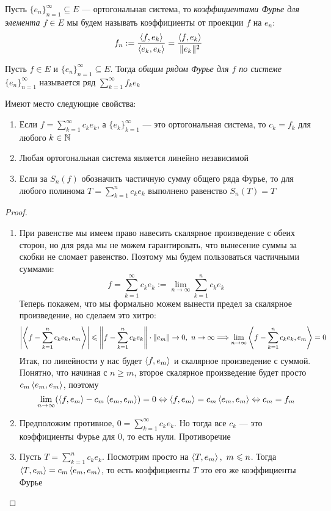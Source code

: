 \begin{definition}
	Пусть $\{e_n\}_{n = 1}^\infty \subseteq E$ --- ортогональная система, то \textit{коэффициентами Фурье для элемента $f \in E$} мы будем называть коэффициенты от проекции $f$ на $e_n$:
	\[
		f_n := \frac{\left\langle f, e_k\right\rangle}{\left\langle e_k, e_k\right\rangle} = \frac{\left\langle f, e_k\right\rangle}{\|e_k\|^2}
	\]
\end{definition}

\begin{definition}
	Пусть $f \in E$ и $\{e_n\}_{n = 1}^\infty \subseteq E$. Тогда \textit{общим рядом Фурье для $f$ по системе $\{e_n\}_{n = 1}^\infty$} называется ряд $\sum_{k = 1}^\infty f_ke_k$
\end{definition}

\begin{proposition}
	Имеют место следующие свойства:
	\begin{enumerate}
		\item Если $f = \sum_{k = 1}^\infty c_ke_k$, а $\{e_k\}_{k = 1}^\infty$ --- это ортогональная система, то $c_k = f_k$ для любого $k \in \mathbb{N}$
		
		\item Любая ортогональная система является линейно независимой
		
		\item Если за $S_n(f)$ обозначить частичную сумму общего ряда Фурье, то для любого полинома $T = \sum_{k = 1}^n c_ke_k$ выполнено равенство $S_n(T) = T$
	\end{enumerate}
\end{proposition}

\begin{proof}~
	\begin{enumerate}
		\item При равенстве мы имеем право навесить скалярное произведение с обеих сторон, но для ряда мы не можем гарантировать, что вынесение суммы за скобки не сломает равенство. Поэтому мы будем пользоваться частичными суммами:
		\[
			f = \sum_{k = 1}^\infty c_ke_k := \lim_{n \to \infty} \sum_{k = 1}^n c_ke_k
		\]
		Теперь покажем, что мы формально можем вынести предел за скалярное произведение, но сделаем это хитро:
		\[
			\left|\left\langle f - \sum_{k = 1}^n c_ke_k, e_m\right\rangle\right| \leqslant \left\|f - \sum_{k = 1}^n c_ke_k\right\| \cdot \|e_m\| \to 0,\ n \to \infty \Longrightarrow \lim_{n \to \infty} \left\langle f - \sum_{k = 1}^n c_ke_k, e_m\right\rangle = 0
		\]
		Итак, по линейности у нас будет $\left\langle f, e_m\right\rangle$ и скалярное произведение с суммой. Понятно, что начиная с $n \ge m$, второе скалярное произведение будет просто $c_m\left\langle e_m, e_m\right\rangle$, поэтому
		\[
			\lim_{n \to \infty} (\left\langle f, e_m\right\rangle - c_m\left\langle e_m, e_m\right\rangle) = 0 \Leftrightarrow \left\langle f, e_m\right\rangle = c_m\left\langle e_m, e_m\right\rangle \Leftrightarrow c_m = f_m
		\]
		
		\item Предположим противное, $0 = \sum_{k = 1}^\infty c_ke_k$. Но тогда все $c_k$ --- это коэффициенты Фурье для 0, то есть нули. Противоречие
		
		\item Пусть $T = \sum_{k = 1}^n c_ke_k$. Посмотрим просто на $\left\langle T, e_m\right\rangle,\ m \leqslant n$. Тогда $\left\langle T, e_m\right\rangle = c_m\left\langle e_m, e_m\right\rangle$, то есть коэффициенты $T$ это его же коэффициенты Фурье
	\end{enumerate}
\end{proof}

